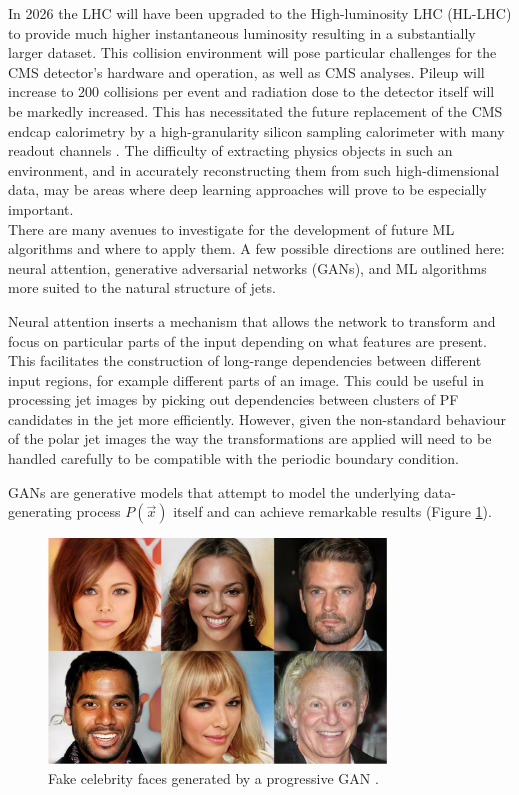 In 2026 the LHC will have been upgraded to the High-luminosity LHC (HL-LHC) \cite{HLLHC} to provide much higher instantaneous luminosity resulting in a substantially larger dataset. 
This collision environment will pose particular challenges for the CMS detector's hardware and operation, as well as CMS analyses.  
Pileup will increase to 200 collisions per event and radiation dose to the detector itself will be markedly increased. This has necessitated the future replacement of the CMS endcap calorimetry by a high-granularity silicon sampling calorimeter with many readout channels \cite{HGC}. 
The difficulty of extracting physics objects in such an environment, and in accurately reconstructing them from such high-dimensional data, may be areas where deep learning approaches will prove to be especially important. \\


There are many avenues to investigate for the development of future ML algorithms and where to apply them. 
A few possible directions are outlined here: neural attention, generative adversarial networks (GANs), and ML algorithms more suited to the natural structure of jets.

Neural attention \cite{Attention,SpatialTransformer} inserts a mechanism that allows the network to transform and focus on particular parts of the input depending on what features are present. 
This facilitates the construction of long-range dependencies between different input regions, for example different parts of an image.
This could be useful in processing jet images by picking out dependencies between clusters of PF candidates in the jet more efficiently.
However, given the non-standard behaviour of the polar jet images the way the transformations are applied will need to be handled carefully to be compatible with the periodic boundary condition.

GANs \cite{GANs} are generative models that attempt to model the underlying data-generating process $P(\vec{x})$ itself and can achieve remarkable results (Figure \ref{fig:conclusion:progan}).
\begin{figure}[h!]
    \begin{center}
        \includegraphics[width=0.8\textwidth]{figures/conclusion/progan.png}
    \end{center}
    \caption{Fake celebrity faces generated by a progressive GAN \cite{ProGAN}.}
        \label{fig:conclusion:progan}
\end{figure}

